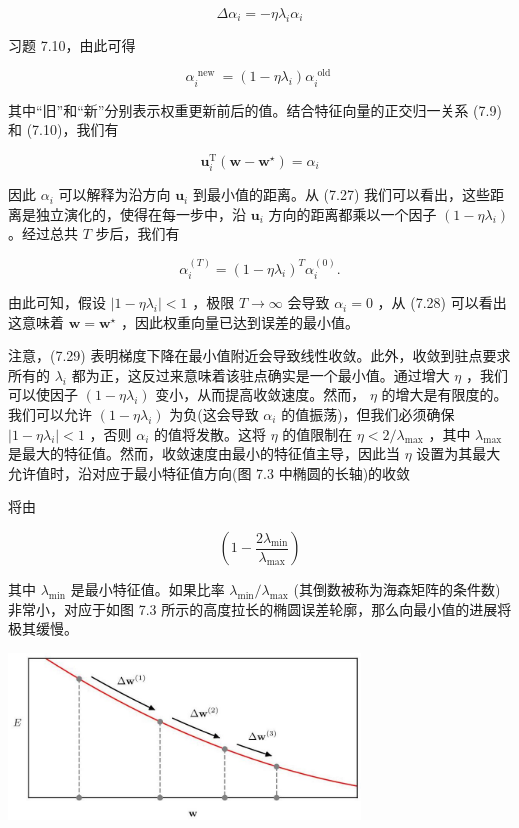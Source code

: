 \documentclass[10pt]{article}
\begin{document}
\[
\Delta {\alpha }_{i} =  - \eta {\lambda }_{i}{\alpha }_{i} \tag{7.26}
\]

习题 7.10，由此可得

\[
{\alpha }_{i}^{\text{ new }} = \left( {1 - \eta {\lambda }_{i}}\right) {\alpha }_{i}^{\text{ old }} \tag{7.27}
\]

其中“旧”和“新”分别表示权重更新前后的值。结合特征向量的正交归一关系 (7.9) 和 (7.10)，我们有

\[
{\mathbf{u}}_{i}^{\mathrm{T}}\left( {\mathbf{w} - {\mathbf{w}}^{ \star  }}\right)  = {\alpha }_{i} \tag{7.28}
\]

因此 \({\alpha }_{i}\) 可以解释为沿方向 \({\mathbf{u}}_{i}\) 到最小值的距离。从 (7.27) 我们可以看出，这些距离是独立演化的，使得在每一步中，沿 \({\mathbf{u}}_{i}\) 方向的距离都乘以一个因子 \(\left( {1 - \eta {\lambda }_{i}}\right)\) 。经过总共 \(T\) 步后，我们有

\[
{\alpha }_{i}^{\left( T\right) } = {\left( 1 - \eta {\lambda }_{i}\right) }^{T}{\alpha }_{i}^{\left( 0\right) }. \tag{7.29}
\]

由此可知，假设 \(\left| {1 - \eta {\lambda }_{i}}\right|  < 1\) ，极限 \(T \rightarrow  \infty\) 会导致 \({\alpha }_{i} = 0\) ，从 (7.28) 可以看出这意味着 \(\mathbf{w} = {\mathbf{w}}^{ \star  }\) ，因此权重向量已达到误差的最小值。

注意，(7.29) 表明梯度下降在最小值附近会导致线性收敛。此外，收敛到驻点要求所有的 \({\lambda }_{i}\) 都为正，这反过来意味着该驻点确实是一个最小值。通过增大 \(\eta\) ，我们可以使因子 \(\left( {1 - \eta {\lambda }_{i}}\right)\) 变小，从而提高收敛速度。然而， \(\eta\) 的增大是有限度的。我们可以允许 \(\left( {1 - \eta {\lambda }_{i}}\right)\) 为负(这会导致 \({\alpha }_{i}\) 的值振荡)，但我们必须确保 \(\left| {1 - \eta {\lambda }_{i}}\right|  < 1\) ，否则 \({\alpha }_{i}\) 的值将发散。这将 \(\eta\) 的值限制在 \(\eta  < 2/{\lambda }_{\max }\) ，其中 \({\lambda }_{\max }\) 是最大的特征值。然而，收敛速度由最小的特征值主导，因此当 \(\eta\) 设置为其最大允许值时，沿对应于最小特征值方向(图 7.3 中椭圆的长轴)的收敛

将由

\[
\left( {1 - \frac{2{\lambda }_{\min }}{{\lambda }_{\max }}}\right)  \tag{7.30}
\]

其中 \({\lambda }_{\min }\) 是最小特征值。如果比率 \({\lambda }_{\min }/{\lambda }_{\max }\) (其倒数被称为海森矩阵的条件数)非常小，对应于如图 7.3 所示的高度拉长的椭圆误差轮廓，那么向最小值的进展将极其缓慢。

\begin{center}
\includegraphics[max width=0.7\textwidth]{images/0194e279-9b28-703a-88f4-c3ac21e2010d_239_542_345_930_442_0.jpg}
\end{center}
\hspace*{3em} 
\end{document}
